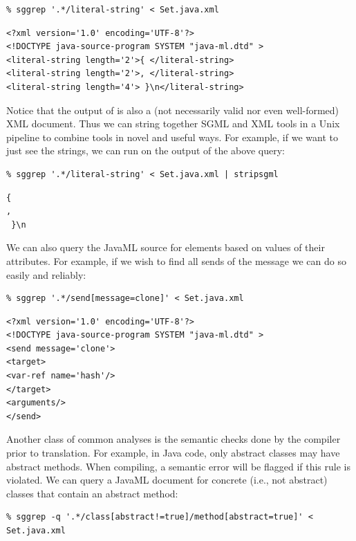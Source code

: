 \documentclass{article}
\begin{document}
\begin{verbatim}
% sggrep '.*/literal-string' < Set.java.xml
\end{verbatim}

\begin{verbatim}
<?xml version='1.0' encoding='UTF-8'?>
<!DOCTYPE java-source-program SYSTEM "java-ml.dtd" >
<literal-string length='2'>{ </literal-string>
<literal-string length='2'>, </literal-string>
<literal-string length='4'> }\n</literal-string>
\end{verbatim}

Notice that the output of  is also a (not necessarily
valid nor even well-formed) XML document.  Thus we can string together
SGML and XML tools in a Unix pipeline to combine tools in novel and
useful ways.  For example, if we want to just see the strings, we can
run  on the output of the above query:

\begin{verbatim}
% sggrep '.*/literal-string' < Set.java.xml | stripsgml
\end{verbatim}
\begin{verbatim}
{ 
, 
 }\n
\end{verbatim}

We can also query the JavaML source for elements based on values of
their attributes.  For example, if we wish to find all sends of the
message  we can do so easily and reliably:

\begin{verbatim}
% sggrep '.*/send[message=clone]' < Set.java.xml 
\end{verbatim}
\begin{verbatim}
<?xml version='1.0' encoding='UTF-8'?>
<!DOCTYPE java-source-program SYSTEM "java-ml.dtd" >
<send message='clone'>
<target>
<var-ref name='hash'/>
</target>
<arguments/>
</send>
\end{verbatim}

Another class of common analyses is the semantic checks done by the
compiler prior to translation.  For example, in Java code, only abstract
classes may have abstract methods.  When compiling, a semantic error
will be flagged if this rule is violated.  We can query a JavaML document
for concrete (i.e., not abstract) classes that contain an abstract method:

\begin{verbatim}
% sggrep -q '.*/class[abstract!=true]/method[abstract=true]' < Set.java.xml
\end{verbatim}
\end{document}
